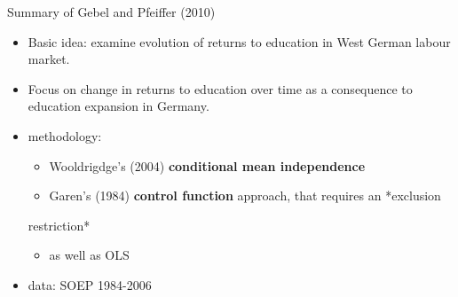 \documentclass[10pt,ignorenonframetext,]{beamer}
\providecommand{\tightlist}{%
  \setlength{\itemsep}{0pt}\setlength{\parskip}{0pt}}
\begin{document}
\begin{frame}{Summary of Gebel and Pfeiffer (2010)}
\protect\hypertarget{summary-of-gebel-and-pfeiffer-2010}{}

\begin{itemize}
\item
  Basic idea: examine evolution of returns to education in West German
  labour market.
\item
  Focus on change in returns to education over time as a consequence to
  education expansion in Germany.
\item
  methodology:

  \begin{itemize}
  \tightlist
  \item
    Wooldrigdge's (2004) \textbf{conditional mean independence}
  \item
    Garen's (1984) \textbf{control function} approach, that requires an
    *exclusion
  \end{itemize}

  restriction*

  \begin{itemize}
  \tightlist
  \item
    as well as OLS
  \end{itemize}
\item
  data: SOEP 1984-2006
\end{itemize}

\end{frame}
\end{document}
